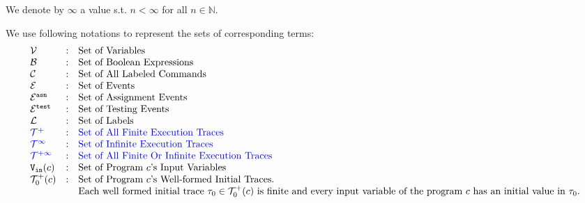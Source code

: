We denote by $\infty$ a value s.t. $n < \infty $ for all $n \in \mathbb{N}$.

We use following notations to represent the sets of corresponding terms:
\[
\begin{array}{lll}
\vardom & : & \mbox{Set of Variables}  
\\ 
%
\booldom & : & \mbox{Set of Boolean Expressions}  
\\ 
%
\cdom & : & \mbox{Set of All Labeled Commands} 
\\ 
%
\eventset  & : & \mbox{Set of Events}  
\\
%
\eventset^{\asn}  & : & \mbox{Set of Assignment Events}  
\\
%
\eventset^{\test}  & : & \mbox{Set of Testing Events}  
\\
%
\ldom  & : & \mbox{Set of Labels}  
\\
%
\highlight{\ftdom} & : & \mbox{\highlight{Set of All Finite Execution Traces}}
\\
\highlight{\inftdom} & : & \mbox{\highlight{Set of Infinite  Execution Traces}}
\\
\highlight{\tdom} & : & \mbox{\highlight{Set of All Finite Or Infinite  Execution Traces}}
\\ 
%
\inpvar(c) & : & \mbox{Set of Program $c$'s Input Variables}  
\\
%
\ftdom_0(c) & : & \mbox{Set of Program $c$'s Well-formed Initial Traces.}
\\ & & \mbox{Each well formed initial trace $\trace_0 \in \ftdom_0(c)$ is finite and every input variable of the program $c$ has an initial value in $\trace_0$.}
\end{array}
\]
%

